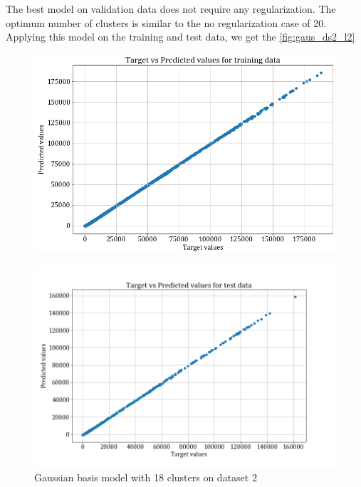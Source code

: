 \documentclass[12pt,a4paper]{article}
\newcommand{\noi}{\noindent}
\begin{document}
\noi
The best model on validation data does not require any regularization. The optimum number of clusters is similar to the no regularization case of 20. Applying this model on the training and test data, we get the \autoref{fig:gaus_ds2_l2}

\begin{figure}[H]
    \centering
    \includegraphics[scale=0.5]{images/train_ds2_L2reg.png}
    \end{figure}
\begin{figure}[H]
    \centering
    \includegraphics[scale=0.5]{images/test_ds2_L2reg.png}
    \caption{Gaussian basis model with 18 clusters on dataset 2}
    \label{fig:gaus_ds2_l2}
\end{figure}
\end{document}
